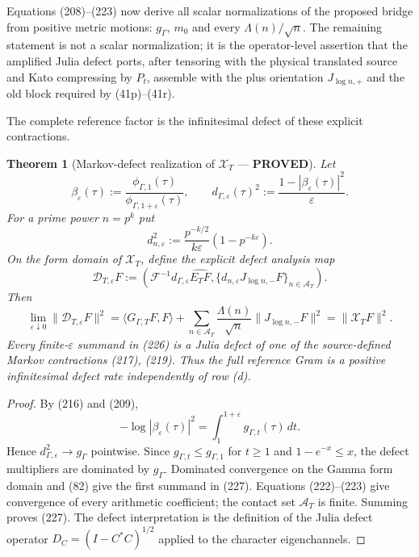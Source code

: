 \documentclass[11pt]{article}
\newtheorem{theorem}{Theorem}
\newcommand{\PROVED}{\textcolor{green!45!black}{\textbf{PROVED}}}
\begin{document}
Equations (208)--(223) now derive all scalar normalizations of the proposed
bridge from positive metric motions: $g_\Gamma$, $m_0$ and every
$\Lambda(n)/\sqrt n$.  The remaining statement is not a scalar
normalization; it is the operator-level assertion that the amplified Julia
defect ports, after tensoring with the physical translated source and Kato
compressing by $P_t$, assemble with the plus orientation
$J_{\log n,+}$ and the old block required by (41p)--(41r).

The complete reference factor is the infinitesimal defect of these explicit
contractions.

\begin{theorem}[Markov-defect realization of $\mathcal X_T$ --- \PROVED]
Let
\begin{equation}
 \beta_\varepsilon(\tau):=
 \frac{\phi_{\Gamma,1}(\tau)}
      {\phi_{\Gamma,1+\varepsilon}(\tau)},
 \qquad
 d_{\Gamma,\varepsilon}(\tau)^2
 :=\frac{1-|\beta_\varepsilon(\tau)|^2}{\varepsilon}. \tag{224}
\end{equation}
For a prime power $n=p^k$ put
\begin{equation}
 d_{n,\varepsilon}^2
 :=\frac{p^{-k/2}}{k\varepsilon}
       (1-p^{-k\varepsilon}).                         \tag{225}
\end{equation}
On the form domain of $\mathcal X_T$, define the explicit defect analysis
map
\begin{equation}
 \mathcal D_{T,\varepsilon}F:=
 \left(
   \mathcal F^{-1}d_{\Gamma,\varepsilon}\widehat{E_TF},
   \{d_{n,\varepsilon}J_{\log n,-}F\}_{n\in\mathcal A_T}
 \right).                                             \tag{226}
\end{equation}
Then
\begin{equation}
 \lim_{\varepsilon\downarrow0}
 \|\mathcal D_{T,\varepsilon}F\|^2
 =\langle G_{\Gamma,T}F,F\rangle
  +\sum_{n\in\mathcal A_T}\frac{\Lambda(n)}{\sqrt n}
       \|J_{\log n,-}F\|^2
 =\|\mathcal X_TF\|^2.                               \tag{227}
\end{equation}
Every finite-$\varepsilon$ summand in (226) is a Julia defect of one of the
source-defined Markov contractions (217), (219).  Thus the full reference
Gram is a positive infinitesimal defect rate independently of row (d).
\end{theorem}

\begin{proof}
By (216) and (209),
\[
 -\log|\beta_\varepsilon(\tau)|^2
 =\int_1^{1+\varepsilon}g_{\Gamma,t}(\tau)\,dt.
\]
Hence $d_{\Gamma,\varepsilon}^2\to g_\Gamma$ pointwise.
Since $g_{\Gamma,t}\le g_{\Gamma,1}$ for $t\ge1$ and
$1-e^{-x}\le x$, the defect multipliers are dominated by $g_\Gamma$.
Dominated convergence on the Gamma form domain and (82) give the first
summand in (227).  Equations (222)--(223) give convergence of every
arithmetic coefficient; the contact set $\mathcal A_T$ is finite.  Summing
proves (227).  The defect interpretation is the definition of the Julia
defect operator $D_C=(I-C^*C)^{1/2}$ applied to the character eigenchannels.
\end{proof}
\end{document}
